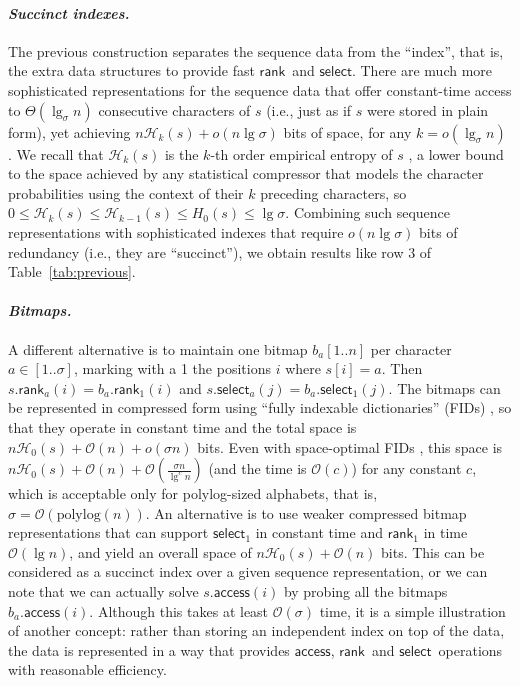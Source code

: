 \documentclass[11pt]{article}
\newcommand{\Oh}[1]
    {\ensuremath{\mathcal{O}\left( {#1} \right)}}
\newcommand{\access}
    {\ensuremath{\mathsf{access}}}
\newcommand{\rank}
    {\ensuremath{\mathsf{rank}}}
\newcommand{\select}
    {\ensuremath{\mathsf{select}}}
\newcommand{\HH}{\mathcal{H}}
\newcommand{\Ho}{\HH_0}
\newcommand{\Hk}{\HH_k}
\begin{document}
\paragraph{\em Succinct indexes.}
The previous construction separates the sequence data from the
``index'', that is, the extra data structures to provide fast
\rank\ and \select.  There are much more sophisticated representations
for the sequence data that offer constant-time access to
$\Theta(\lg_\sigma n)$ consecutive characters of $s$ (i.e., just as if
$s$ were stored in plain form), yet achieving $n\Hk(s)+o(n\lg\sigma)$
bits of space, for any $k=o(\lg_\sigma n)$ \cite{SG06,GN06,FV07}. We
recall that $\Hk(s)$ is the $k$-th order empirical entropy of $s$
\cite{Man01}, a lower bound to the space achieved by any statistical
compressor that models the character probabilities using the context
of their $k$ preceding characters, so $0 \le \Hk(s) \le \HH_{k-1}(s)
\le H_0(s) \le \lg\sigma$. Combining such sequence representations
with sophisticated indexes that require $o(n\lg\sigma)$ bits of
redundancy \cite{BHMR07,GOR10} (i.e., they are ``succinct''), we
obtain results like row 3 of Table~\ref{tab:previous}.

\paragraph{\em Bitmaps.}
A different alternative is to maintain one bitmap $b_a[1..n]$ per character 
$a \in [1..\sigma]$, marking with a 1 the positions $i$ where $s[i]=a$. Then 
$s.\rank_a(i) = b_a.\rank_1(i)$ and $s.\select_a(j) = b_a.\select_1(j)$. The 
bitmaps can be represented in compressed form using ``fully indexable 
dictionaries'' (FIDs) \cite{RRR02}, so that they operate in constant time and 
the total space is $n\Ho(s)+\Oh{n}+o(\sigma n)$ bits. Even with space-optimal 
FIDs \cite{Pat08,Pat09}, this space is $n\Ho(s)+\Oh{n}+
\Oh{\frac{\sigma n}{\lg^c n}}$ (and the time is $\Oh{c}$) for any constant 
$c$, which is acceptable only for polylog-sized 
alphabets, that is, $\sigma = \Oh{\textrm{polylog}(n)}$. An alternative is to 
use weaker compressed bitmap representations \cite{GV05,OS07} that can support
$\select_1$ in constant time and $\rank_1$ in time $\Oh{\lg n}$, and yield
an overall space of $n\Ho(s)+\Oh{n}$ bits. This can be considered as a succinct
index over a given sequence representation, or we can note that we can
actually solve $s.\access(i)$ by probing all the bitmaps $b_a.\access(i)$.
Although this takes at least $\Oh{\sigma}$ time, it is a simple illustration of
another concept: rather than storing an independent index on top of the data, 
the data is represented in a way that provides \access, \rank\ and \select\ 
operations with reasonable efficiency.
\end{document}
